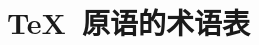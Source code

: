 \documentclass{book}
\begin{document}
%
\chapter{\TeX\ 原语的术语表}
\begin{raggedright}

\end{raggedright}
\endofchapter
\end{document}
